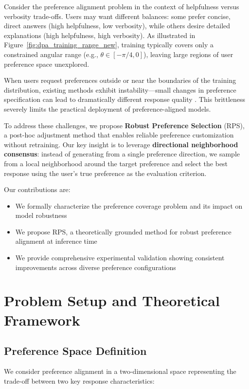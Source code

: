 \documentclass{article} %
\begin{document}
Consider the preference alignment problem in the context of helpfulness versus verbosity trade-offs. Users may want different balances: some prefer concise, direct answers (high helpfulness, low verbosity), while others desire detailed explanations (high helpfulness, high verbosity). As illustrated in Figure~\ref{fig:dpa_training_range_new}, training typically covers only a constrained angular range (e.g., $\theta \in [-\pi/4, 0]$), leaving large regions of user preference space unexplored.

When users request preferences outside or near the boundaries of the training distribution, existing methods exhibit instability—small changes in preference specification can lead to dramatically different response quality \cite{Hinton06}. This brittleness severely limits the practical deployment of preference-aligned models.

To address these challenges, we propose \textbf{Robust Preference Selection} (RPS), a post-hoc adjustment method that enables reliable preference customization without retraining. Our key insight is to leverage \textbf{directional neighborhood consensus}: instead of generating from a single preference direction, we sample from a local neighborhood around the target preference and select the best response using the user's true preference as the evaluation criterion.

Our contributions are:
\begin{itemize}
    \item We formally characterize the preference coverage problem and its impact on model robustness
    \item We propose RPS, a theoretically grounded method for robust preference alignment at inference time
    \item We provide comprehensive experimental validation showing consistent improvements across diverse preference configurations
\end{itemize}

\section{Problem Setup and Theoretical Framework}

\subsection{Preference Space Definition}

We consider preference alignment in a two-dimensional space representing the trade-off between two key response characteristics:
\end{document}
